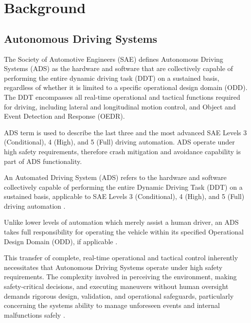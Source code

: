 \section{Background}  \label{Background}



\subsection{Autonomous Driving Systems} \label{Background:ADS}


The Society of Automotive Engineers (SAE) defines Autonomous Driving Systems (ADS) as the hardware and software that are collectively capable of performing the entire dynamic driving task (DDT) on a sustained basis, regardless of whether it is limited to a specific operational design domain (ODD). The DDT encompasses all real-time operational and tactical functions required for driving, including lateral and longitudinal motion control, and Object and Event Detection and Response (OEDR).

\cite{sae:j3016:2021apr}



ADS term is used to describe the last three and the most advanced SAE Levels 3 (Conditional), 4 (High), and 5 (Full) driving automation. ADS operate under high safety requirements, therefore crash mitigation and avoidance capability is part of ADS functionality.

An Automated Driving System (ADS) refers to the hardware and software
collectively capable of performing the entire Dynamic Driving Task (DDT)
on a sustained basis, applicable to SAE Levels 3 (Conditional), 4
(High), and 5 (Full) driving automation{ \textsuperscript{} }.

Unlike
lower levels of automation which merely assist a human driver, an ADS
takes full responsibility for operating the vehicle within its specified
Operational Design Domain (ODD), if applicable{ \textsuperscript{} }.

This transfer of complete, real-time operational and tactical control {
\textsuperscript{} } inherently necessitates that Autonomous Driving
Systems operate under high safety requirements. The complexity involved
in perceiving the environment, making safety-critical decisions, and
executing maneuvers without human oversight demands rigorous design,
validation, and operational safeguards, particularly concerning the
system\textquotesingle s ability to manage unforeseen events and
internal malfunctions safely{ \textsuperscript{} }. { ~ }

